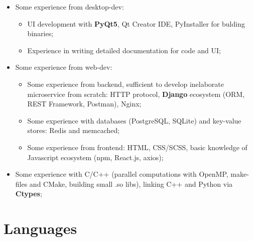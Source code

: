 \documentclass[12pt,a4paper]{moderncv}
\begin{document}
{\begin{itemize}
\begin{itemize}
        gradient boosting with \textbf{CatBoost}; experience with Torch framework; \newline
        \item Advanced work with \textbf{LaTeX} for scientific texts and presentations; \newline
    \end{itemize} 
 \item Some experience from desktop-dev:\newline
    \begin{itemize}
        \item UI development with \textbf{PyQt5}, Qt Creator IDE, PyInstaller for bulding binaries; \newline
        \item Experience in writing detailed documentation for code and UI; \newline
    \end{itemize}
 \item Some experience from web-dev: \newline
    \begin{itemize}
        \item Some experience from backend, sufficient to develop inelaborate microservice from scratch: 
          HTTP protocol, \textbf{Django} ecosystem (ORM, REST Framework, Postman), Nginx;\newline
        \item Some experience with databases (PostgreSQL, SQLite) and key-value stores: Redis and memcached;\newline
        \item Some experience from frontend: 
          HTML, CSS/SCSS, basic knowledge of Javascript ecosystem (npm, React.js, axios); \newline
    \end{itemize}
 \item Some experience with C/C++ (parallel computations with OpenMP, make-files and CMake, building small .so libs), linking C++ and Python via \textbf{Ctypes}; \newline \newline
\end{itemize}
}{}{}{}{}
\section{Languages}
\end{document}
